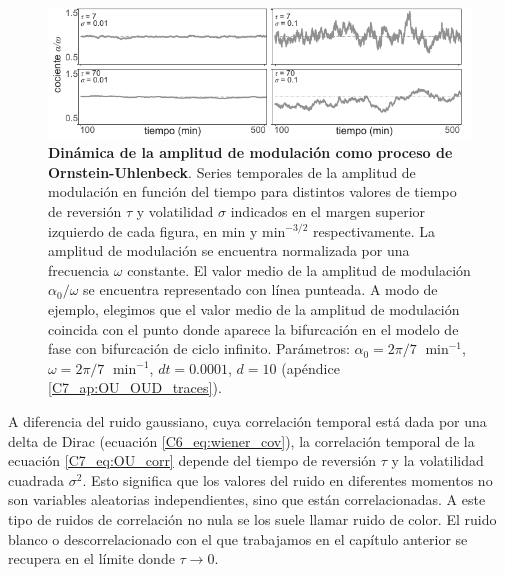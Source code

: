 \documentclass[./main.tex]{subfiles}
\begin{document}
\begin{figure}
    \centering
    \includegraphics[width=1\columnwidth]{figures/chapter7/C7_OU_alpha.pdf} 
    \caption{\textbf{Dinámica de la amplitud de modulación como proceso de Ornstein-Uhlenbeck}. Series temporales de la amplitud de modulación en función del tiempo para distintos valores de tiempo de reversión $\tau$ y volatilidad $\sigma$ indicados en el margen superior izquierdo de cada figura, en min y $\text{min}^{-3/2}$ respectivamente. La amplitud de modulación se encuentra normalizada por una frecuencia $\omega$ constante. El valor medio de la amplitud de modulación $\alpha_0/\omega$ se encuentra representado con línea punteada. A modo de ejemplo, elegimos que el valor medio de la amplitud de modulación coincida con el punto donde aparece la bifurcación en el modelo de fase con bifurcación de ciclo infinito. Parámetros: $\alpha_0 = 2\pi/7 \;\text{ min}^{-1}$, $\omega = 2\pi/7 \;\text{ min}^{-1}$, $dt = 0.0001$, $d=10$ (apéndice \ref{C7_ap:OU_OUD_traces}).}
    \label{C7_fig:OU_alpha}
\end{figure} 

A diferencia del ruido gaussiano, cuya correlación temporal está dada por una delta de Dirac (ecuación \ref{C6_eq:wiener_cov}), la correlación temporal de la ecuación \ref{C7_eq:OU_corr} depende del tiempo de reversión $\tau$ y la volatilidad cuadrada $\sigma^2$. Esto significa que los valores del ruido en diferentes momentos no son variables aleatorias independientes, sino que están correlacionadas. A este tipo de ruidos de correlación no nula se los suele llamar ruido de color. El ruido blanco o descorrelacionado con el que trabajamos en el capítulo anterior se recupera en el límite donde $\tau \rightarrow 0$. 


\end{document}
